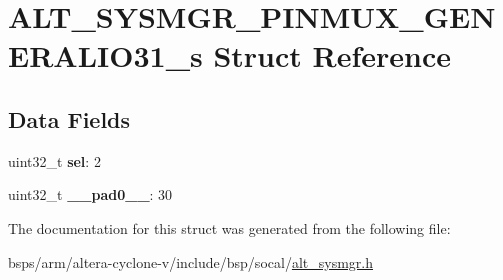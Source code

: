 \hypertarget{structALT__SYSMGR__PINMUX__GENERALIO31__s}{}\section{A\+L\+T\+\_\+\+S\+Y\+S\+M\+G\+R\+\_\+\+P\+I\+N\+M\+U\+X\+\_\+\+G\+E\+N\+E\+R\+A\+L\+I\+O31\+\_\+s Struct Reference}
\label{structALT__SYSMGR__PINMUX__GENERALIO31__s}
\subsection*{Data Fields}
\begin{DoxyCompactItemize}
\item 
\mbox{\label{structALT__SYSMGR__PINMUX__GENERALIO31__s_ae8867cbc4cff05793bd328eda255a386}} 
uint32\+\_\+t {\bfseries sel}\+: 2
\item 
\mbox{\label{structALT__SYSMGR__PINMUX__GENERALIO31__s_a78b5af4d1e8ee03766f90b7c8fa17fa2}} 
uint32\+\_\+t {\bfseries \+\_\+\+\_\+pad0\+\_\+\+\_\+}\+: 30
\end{DoxyCompactItemize}


The documentation for this struct was generated from the following file\+:\begin{DoxyCompactItemize}
\item 
bsps/arm/altera-\/cyclone-\/v/include/bsp/socal/\mbox{\hyperlink{alt__sysmgr_8h}{alt\+\_\+sysmgr.\+h}}\end{DoxyCompactItemize}
